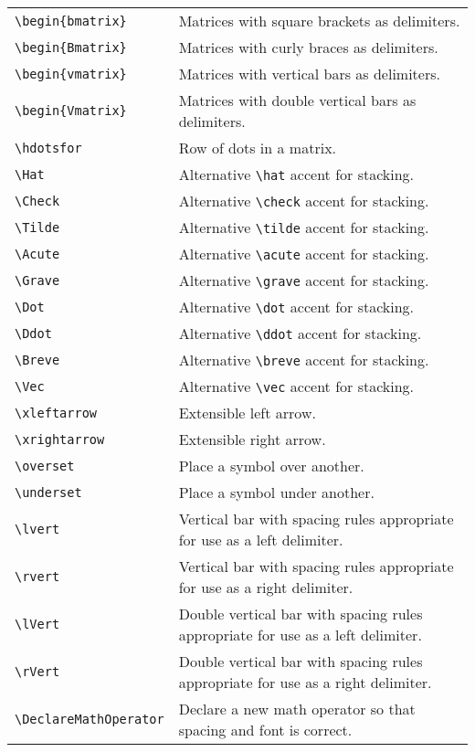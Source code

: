 \documentclass[%
twocolumn,secnumarabic,amssymb, amsmath, nofootinbib,tightenlines,
nobibnotes, aps, 
prl,
]{revtex4-1}
\begin{document}
\begin{longtable*}{@{\extracolsep{0in}}p{3in}p{4in}}
\verb+\begin{bmatrix}+ & Matrices with square brackets as delimiters.\\
\verb+\begin{Bmatrix}+ & Matrices with curly braces as delimiters.\\
\verb+\begin{vmatrix}+ & Matrices with vertical bars as delimiters.\\
\verb+\begin{Vmatrix}+ & Matrices with double vertical bars as
delimiters.\\
\verb+\hdotsfor+ & Row of dots in a matrix.\\
\verb+\Hat+ & Alternative \verb+\hat+ accent for stacking.\\
\verb+\Check+ & Alternative \verb+\check+ accent for stacking.\\
\verb+\Tilde+ & Alternative \verb+\tilde+ accent for stacking.\\
\verb+\Acute+ & Alternative \verb+\acute+ accent for stacking.\\
\verb+\Grave+ & Alternative \verb+\grave+ accent for stacking.\\
\verb+\Dot+ & Alternative \verb+\dot+ accent for stacking.\\
\verb+\Ddot+ & Alternative \verb+\ddot+ accent for stacking.\\
\verb+\Breve+ & Alternative \verb+\breve+ accent for stacking.\\
\verb+\Vec+ & Alternative \verb+\vec+ accent for stacking.\\
\verb+\xleftarrow+ & Extensible left arrow.\\
\verb+\xrightarrow+ & Extensible right arrow.\\
\verb+\overset+ & Place a symbol over another.\\
\verb+\underset+ & Place a symbol under another.\\
\verb+\lvert+ & Vertical bar with spacing rules appropriate for use as
a left delimiter.\\
\verb+\rvert+ & Vertical bar with spacing rules appropriate for use as
a right delimiter.\\
\verb+\lVert+ & Double vertical bar with spacing rules appropriate for use as
a left delimiter.\\
\verb+\rVert+ & Double vertical bar with spacing rules appropriate for use as
a right delimiter.\\
\verb+\DeclareMathOperator+ & Declare a new math operator so that
spacing and font is correct.\\

\end{longtable*}
\end{document}
